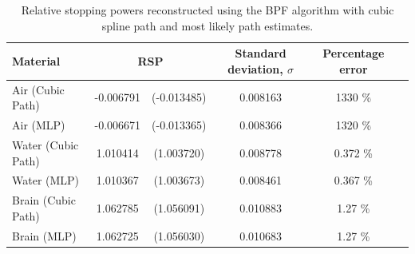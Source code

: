 \documentclass[11pt,a4paper]{article}
\begin{document}

\begin{table}
\centering
\caption{Relative stopping powers reconstructed using the BPF algorithm with cubic spline path and most likely path estimates.}
\begin{tabular}{l|ccccc}
\hline
Material &  \multicolumn{2}{c}{RSP} & Standard deviation, $\sigma$ & Percentage error\\ \hline
Air (Cubic Path)     & -0.006791 & (-0.013485) & 0.008163  & 1330 \% \\
Air (MLP)   & -0.006671 & (-0.013365) & 0.008366 & 1320 \% \\
Water (Cubic Path)   & 1.010414 & (1.003720) & 0.008778 &  0.372 \% \\
Water (MLP) & 1.010367 & (1.003673) & 0.008461 & 0.367 \% \\
Brain (Cubic Path)   & 1.062785 & (1.056091) & 0.010883 & 1.27 \% \\
Brain (MLP) & 1.062725 & (1.056030) & 0.010683 & 1.27 \%\\
\end{tabular} 
\label{table:RSPresultsBPF}
\end{table}
\end{document}

